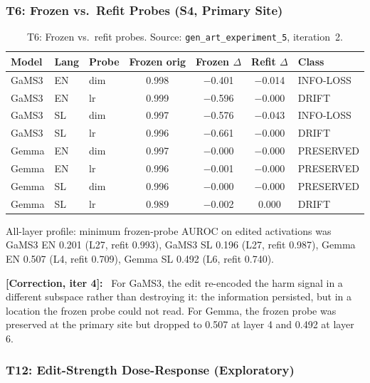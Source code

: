 \documentclass[11pt,letterpaper]{article}
\newcommand{\corr}[1]{\noindent\textbf{[Correction, iter #1]:}~}
\begin{document}
\subsubsection{T6: Frozen vs.\ Refit Probes (S4, Primary Site)}

\begin{table}[!htbp]
\centering
\caption{T6: Frozen vs.\ refit probes. Source: \texttt{gen\_art\_experiment\_5}, iteration~2.}
\label{tab:t6_probes}
\small
\begin{tabular}{lllcccl}
\toprule
Model & Lang & Probe & Frozen orig & Frozen $\Delta$ & Refit $\Delta$ & Class \\
\midrule
GaMS3 & EN & dim & 0.998 & $-$0.401 & $-$0.014 & INFO-LOSS \\
GaMS3 & EN & lr & 0.999 & $-$0.596 & $-$0.000 & DRIFT \\
GaMS3 & SL & dim & 0.997 & $-$0.576 & $-$0.043 & INFO-LOSS \\
GaMS3 & SL & lr & 0.996 & $-$0.661 & $-$0.000 & DRIFT \\
Gemma & EN & dim & 0.997 & $-$0.000 & $-$0.000 & PRESERVED \\
Gemma & EN & lr & 0.996 & $-$0.001 & $-$0.000 & PRESERVED \\
Gemma & SL & dim & 0.996 & $-$0.000 & $-$0.000 & PRESERVED \\
Gemma & SL & lr & 0.989 & $-$0.002 & 0.000 & DRIFT \\
\bottomrule
\end{tabular}
\end{table}

All-layer profile: minimum frozen-probe AUROC on edited activations was GaMS3 EN 0.201 (L27, refit 0.993), GaMS3 SL 0.196 (L27, refit 0.987), Gemma EN 0.507 (L4, refit 0.709), Gemma SL 0.492 (L6, refit 0.740).

\corr{4} For GaMS3, the edit re-encoded the harm signal in a different subspace rather than destroying it: the information persisted, but in a location the frozen probe could not read. For Gemma, the frozen probe was preserved at the primary site but dropped to 0.507 at layer 4 and 0.492 at layer 6.


\subsubsection{T12: Edit-Strength Dose-Response (Exploratory)}
\end{document}

